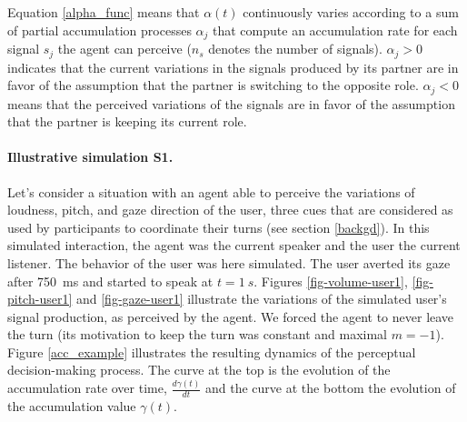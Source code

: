 Equation \ref{alpha_func} means that $\alpha(t)$ continuously varies according to a sum of partial accumulation processes $\alpha_{j}$ that compute an accumulation rate for each signal $s_j$ the agent can perceive ($n_s$ denotes the number of signals). %
$\alpha_{j}>0$ indicates that the current variations in the signals produced by its partner are in favor of the assumption that the partner is switching to  the opposite role.
$\alpha_{j}<0$  means that the perceived variations of the signals are in favor of the assumption that the partner is keeping its current role. 

\paragraph{Illustrative simulation S1.}%
Let's consider a situation with an agent able to perceive the variations of loudness, pitch, and gaze direction of the user, three cues that are considered as used by participants to coordinate their turns (see section \ref{backgd}). 
In this simulated interaction, the agent was the current speaker and the user the current listener. The behavior of the user was here simulated.
The user averted its gaze after 750~ms and started to speak at $t=1~s$. %
Figures \ref{fig-volume-user1}, \ref{fig-pitch-user1} and \ref{fig-gaze-user1} illustrate the variations of the simulated user's signal production, as perceived by the agent. 
We forced the agent to never leave the turn (its motivation to keep the turn was constant and maximal $m = -1$).
Figure \ref{acc_example} illustrates the resulting dynamics of the perceptual decision-making process. 
The curve at the top is the evolution of the accumulation rate over time, $\frac{d\gamma(t)}{dt}$ and the curve at the bottom the evolution of the accumulation value $\gamma(t)$. 


